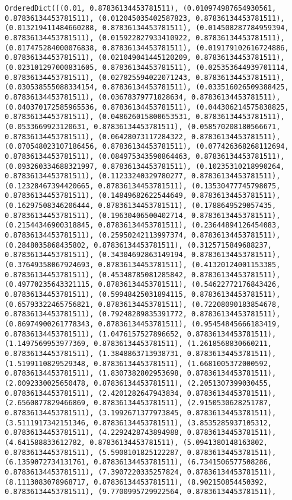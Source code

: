 \documentclass[11pt]{article}
\begin{document}
\begin{Verbatim}[commandchars=\\\{\}]
OrderedDict([(0.01, 0.87836134453781511), (0.010974987654930561, 0.87836134453781511), (0.012045035402587823, 0.87836134453781511), (0.013219411484660288, 0.87836134453781511), (0.014508287784959394, 0.87836134453781511), (0.015922827933410922, 0.87836134453781511), (0.017475284000076838, 0.87836134453781511), (0.019179102616724886, 0.87836134453781511), (0.021049041445120209, 0.87836134453781511), (0.023101297000831605, 0.87836134453781511), (0.025353644939701114, 0.87836134453781511), (0.027825594022071243, 0.87836134453781511), (0.030538555088334154, 0.87836134453781511), (0.033516026509388425, 0.87836134453781511), (0.03678379771828634, 0.87836134453781511), (0.040370172585965536, 0.87836134453781511), (0.044306214575838825, 0.87836134453781511), (0.048626015800653531, 0.87836134453781511), (0.0533669923120631, 0.87836134453781511), (0.058570208180566671, 0.87836134453781511), (0.06428073117284322, 0.87836134453781511), (0.070548023107186456, 0.87836134453781511), (0.077426368268112694, 0.87836134453781511), (0.084975343590864463, 0.87836134453781511), (0.093260334688321997, 0.87836134453781511), (0.10235310218990264, 0.87836134453781511), (0.11233240329780277, 0.87836134453781511), (0.12328467394420665, 0.87836134453781511), (0.13530477745798075, 0.87836134453781511), (0.14849682622544649, 0.87836134453781511), (0.16297508346206444, 0.87836134453781511), (0.1788649529057435, 0.87836134453781511), (0.19630406500402714, 0.87836134453781511), (0.21544346900318845, 0.87836134453781511), (0.23644894126454083, 0.87836134453781511), (0.25950242113997374, 0.87836134453781511), (0.2848035868435802, 0.87836134453781511), (0.3125715849688237, 0.87836134453781511), (0.34304692863149194, 0.87836134453781511), (0.37649358067924693, 0.87836134453781511), (0.41320124001153385, 0.87836134453781511), (0.45348785081285842, 0.87836134453781511), (0.49770235643321115, 0.87836134453781511), (0.54622772176843426, 0.87836134453781511), (0.59948425031894115, 0.87836134453781511), (0.65793322465756821, 0.87836134453781511), (0.72208090183854678, 0.87836134453781511), (0.79248289835391772, 0.87836134453781511), (0.86974900261778343, 0.87836134453781511), (0.95454845666183419, 0.87836134453781511), (1.0476157527896652, 0.87836134453781511), (1.1497569953977369, 0.87836134453781511), (1.2618568830660211, 0.87836134453781511), (1.3848863713938731, 0.87836134453781511), (1.5199110829529348, 0.87836134453781511), (1.6681005372000592, 0.87836134453781511), (1.8307382802953698, 0.87836134453781511), (2.0092330025650478, 0.87836134453781511), (2.2051307399030455, 0.87836134453781511), (2.4201282647943834, 0.87836134453781511), (2.6560877829466869, 0.87836134453781511), (2.9150530628251787, 0.87836134453781511), (3.1992671377973845, 0.87836134453781511), (3.5111917342151346, 0.87836134453781511), (3.8535285937105312, 0.87836134453781511), (4.2292428743894988, 0.87836134453781511), (4.641588833612782, 0.87836134453781511), (5.0941380148163802, 0.87836134453781511), (5.5908101825122287, 0.87836134453781511), (6.1359072734131761, 0.87836134453781511), (6.7341506577508286, 0.87836134453781511), (7.3907220335257824, 0.87836134453781511), (8.1113083078968717, 0.87836134453781511), (8.902150854450392, 0.87836134453781511), (9.7700995729922564, 0.87836134453781511), 
\end{Verbatim}
\end{document}

